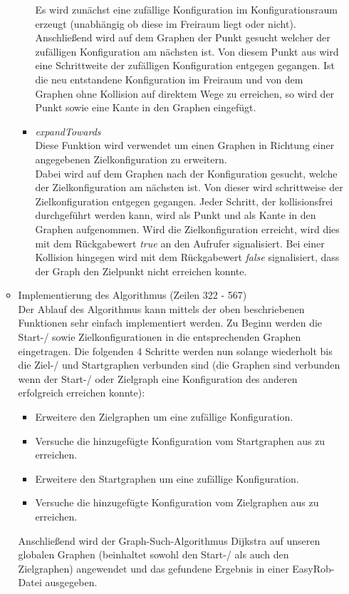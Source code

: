 \documentclass[a4paper]{scrartcl}
\begin{document}
\begin{itemize}
\begin{itemize}
\begin{itemize}
				Es wird zunächst eine zufällige Konfiguration im Konfigurationsraum erzeugt (unabhängig ob diese im Freiraum liegt oder nicht). Anschließend wird auf dem Graphen der Punkt gesucht welcher der zufälligen Konfiguration am nächsten ist. Von diesem Punkt aus wird eine Schrittweite der zufälligen Konfiguration entgegen gegangen. Ist die neu entstandene Konfiguration im Freiraum und von dem Graphen ohne Kollision auf direktem Wege zu erreichen, so wird der Punkt sowie eine Kante in den Graphen eingefügt.
			\item \textit{expandTowards} \\
				Diese Funktion wird verwendet um einen Graphen in Richtung einer angegebenen Zielkonfiguration zu erweitern.\\
				Dabei wird auf dem Graphen nach der Konfiguration gesucht, welche der Zielkonfiguration am nächsten ist. Von dieser wird schrittweise der Zielkonfiguration entgegen gegangen. Jeder Schritt, der kollisionsfrei durchgeführt werden kann, wird als Punkt und als Kante in den Graphen aufgenommen. Wird die Zielkonfiguration erreicht, wird dies mit dem Rückgabewert \textit{true} an den Aufrufer signalisiert. Bei einer Kollision hingegen wird mit dem Rückgabewert \textit{false} signalisiert, dass der Graph den Zielpunkt nicht erreichen konnte.
		\end{itemize}
		\item Implementierung des Algorithmus (Zeilen 322 - 567)\\
			Der Ablauf des Algorithmus kann mittels der oben beschriebenen Funktionen sehr einfach implementiert werden. Zu Beginn werden die Start-/ sowie Zielkonfigurationen in die entsprechenden Graphen eingetragen. Die folgenden 4 Schritte werden nun solange wiederholt bis die Ziel-/ und Startgraphen verbunden sind (die Graphen sind verbunden wenn der Start-/ oder Zielgraph eine Konfiguration des anderen erfolgreich erreichen konnte):
			\begin{itemize}
				\item Erweitere den Zielgraphen um eine zufällige Konfiguration.
				\item Versuche die hinzugefügte Konfiguration vom Startgraphen aus zu erreichen.
				\item Erweitere den Startgraphen um eine zufällige Konfiguration.
				\item Versuche die hinzugefügte Konfiguration vom Zielgraphen aus zu erreichen.
			\end{itemize}
			Anschließend wird der Graph-Such-Algorithmus Dijkstra auf unseren globalen Graphen (beinhaltet sowohl den Start-/ als auch den Zielgraphen) angewendet und das gefundene Ergebnis in einer EasyRob-Datei ausgegeben.
	\end{itemize}
\end{itemize}
\end{document}
